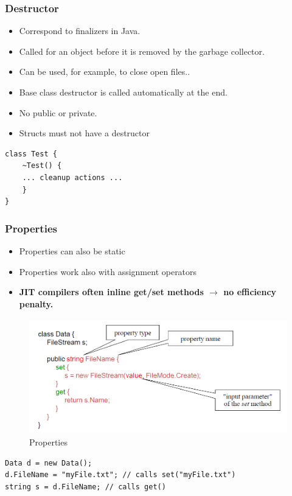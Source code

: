 \subsubsection{Destructor}
\begin{itemize}
	\item Correspond to finalizers in Java.
	\item Called for an object before it is removed by the garbage collector.
	\item Can be used, for example, to close open files..
	\item Base class destructor is called automatically at the end.
	\item No public or private.
	\item Structs must not have a destructor
\end{itemize}
\begin{lstlisting}
class Test {
	~Test() {
	... cleanup actions ...
	}
}
\end{lstlisting}

\subsubsection{Properties}
\begin{itemize}
	\item Properties can also be static
	\item Properties work also with assignment operators
	\item \textbf{JIT compilers often inline get/set methods $\rightarrow$ no efficiency penalty. }
\end{itemize}

\begin{figure}[h]
	\centering
	\includegraphics[height=5cm, ]{images/CSharp/Properties}
	\caption{Properties}
\end{figure}

\begin{lstlisting}
Data d = new Data();
d.FileName = "myFile.txt"; // calls set("myFile.txt")
string s = d.FileName; // calls get()
\end{lstlisting}

